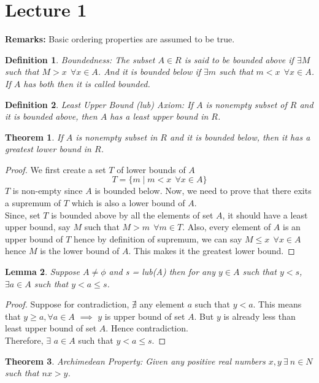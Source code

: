 \documentclass[12pt]{report}
\newtheorem{thm}{Theorem}
\newtheorem{lem}[thm]{Lemma}
\newtheorem{defn}{Definition}
\begin{document}
\section*{Lecture 1}
\textbf{Remarks:} Basic ordering properties are assumed to be true.
\begin{defn}
    Boundedness: The subset $A \in R$ is said to be bounded above if $\exists M$ such that $M > x~~ \forall x \in A$. And it is bounded below if $\exists m$ such that $m < x~~ \forall x \in A$. If $A$ has both then it is called bounded.   
\end{defn}
\begin{defn}
    Least Upper Bound (lub) Axiom: If $A$ is nonempty subset of $R$ and it is bounded above, then $A$ has a least upper bound in $R$.
\end{defn}
\begin{thm}
    If $A$ is nonempty subset in $R$ and it is bounded below, then it has a greatest lower bound in $R$.
\end{thm}
\begin{proof}
    We first create a set $T$ of lower bounds of $A$ $$ T = \{m \mid m < x~~\forall x \in A\}$$ $T$ is non-empty since $A$ is bounded below. Now, we need to prove that there exits a supremum of $T$ which is also a lower bound of $A$.\\
    Since, set $T$ is bounded above by all the elements of set $A$, it should have a least upper bound, say $M$ such that $ M > m~~ \forall m \in T$. Also, every element of $A$ is an upper bound of $T$ hence by definition of supremum, we can say $M \leq x~~ \forall x \in A$ hence $M$ is the lower bound of $A$. This makes it the greatest lower bound.
\end{proof}
\begin{lem}
    Suppose $A \neq \phi$ and s = lub(A) then for any $y \in A$ such that $y < s$, $\exists a \in A$ such that $ y < a \leq s$.
\end{lem}
\begin{proof}
    Suppose for contradiction, $\nexists$ any element $a$ such that $ y < a$. This means that $y \geq a, \forall a \in A$ $\implies$ $y$ is upper bound of set $A$. But $y$ is already less than least upper bound of set $A$. Hence contradiction. \\
    Therefore, $\exists$ $a \in A$ such that $ y < a \leq s$.   
\end{proof} 
\begin{thm}
    Archimedean Property: Given any positive real numbers $x,y~\exists~n \in N$ such that $ nx > y$.
\end{thm}
\end{document}
